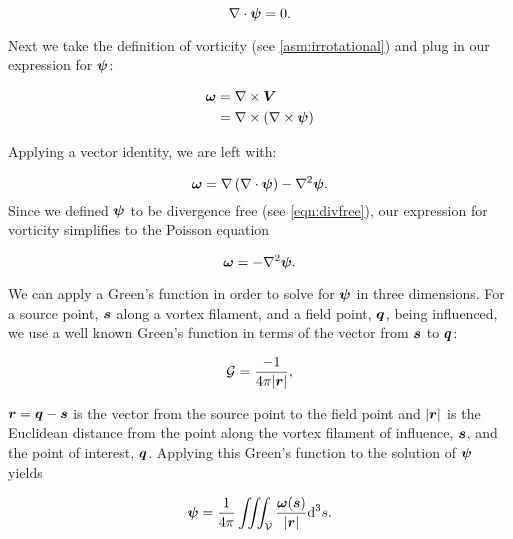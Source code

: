 \begin{equation}
    \label{eqn:divfree}
    \nabla \cdot \bm{\psi} = 0.
\end{equation}


Next we take the definition of vorticity (see \cref{asm:irrotational}) and plug in our expression for \(\bm{\psi}\):

\begin{equation}
    \begin{aligned}
        \bm{\omega} &= \nabla \times \bm{V} \\
         &= \nabla \times \left( \nabla \times \bm{\psi} \right) \\
    \end{aligned}
\end{equation}

\noindent Applying a vector identity, we are left with:

\begin{equation}
    \bm{\omega} = \nabla \left(\nabla \cdot \bm{\psi} \right) - \nabla^2 \bm{\psi}.
\end{equation}
%
Since we defined \(\bm{\psi}\) to be divergence free (see \cref{eqn:divfree}), our expression for vorticity simplifies to the Poisson equation

\begin{equation}
    \bm{\omega} = - \nabla^2 \bm{\psi}.
\end{equation}

We can apply a Green's function in order to solve for \(\bm{\psi}\) in three dimensions.
%
For a source point, \(\bm{s}\) along a vortex filament, and a field point, \(\bm{q}\), being influenced, we use a well known Green's function in terms of the vector from \(\bm{s}\) to \(\bm{q}\):

\begin{equation}
    \mathcal{G} = \frac{-1}{4\pi |\bm{r}|},
\end{equation}

\where \(\bm{r} = \bm{q} - \bm{s}\) is the vector from the source point to the field point and \(|\bm{r}|\) is the Euclidean distance from the point along the vortex filament of influence, \(\bm{s}\), and the point of interest, \(\bm{q}\).
%
Applying this Green's function to the solution of \(\bm{\psi}\) yields

\begin{equation}
    \label{eqn:psi1}
    \bm{\psi} = \frac{1}{4\pi} \iiint_{\mathcal{V}} \frac{\bm{\omega}(\bm{s})}{|\bm{r}|} \mathrm{d}^3s.
\end{equation}

